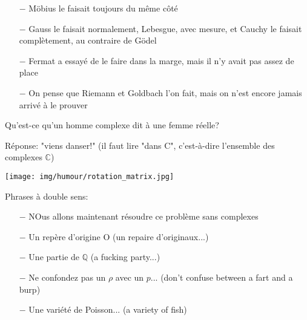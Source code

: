 \begin{itemize}
	\item[$-$] Möbius le faisait toujours du même côté

	\item[$-$] Gauss le faisait normalement, Lebesgue, avec mesure, et Cauchy le faisait complètement, au contraire de Gödel

	\item[$-$] Fermat a essayé de le faire dans la marge, mais il n'y avait pas assez de place

	\item[$-$] On pense que Riemann et Goldbach l'on fait, mais on n'est encore jamais arrivé à le prouver
 \end{itemize}
 
	\begin{center}\underline{\hspace{5 cm}}\end{center}
	 
Qu'est-ce qu'un homme complexe dit à une femme réelle?

Réponse: "viens danser!" (il faut lire "dans C", c'est-à-dire l'ensemble des complexes $\mathbb{C}$)

	\begin{center}\underline{\hspace{5 cm}}\end{center}
	
	\begin{center}
		\texttt{[image: img/humour/rotation\_matrix.jpg]}	
	\end{center}
	
	\begin{center}\underline{\hspace{5 cm}}\end{center}

Phrases à double sens:

\begin{itemize}	 
	\item[$-$] NOus allons maintenant résoudre ce problème sans complexes

	\item[$-$] Un repère d'origine O (un repaire d'originaux...) 

	\item[$-$] Une partie de $\mathbb{Q}$ (a fucking party...)

	\item[$-$] Ne confondez pas un $\rho$ avec un $p$... (don't confuse between a fart and a burp)

	\item[$-$] Une variété de Poisson... (a variety of fish)
\end{itemize}

